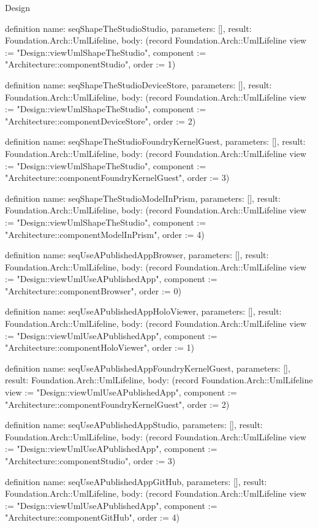 \begin{lexlean}{Design}
\begin{semanticmodule}
definition{
  name: seqShapeTheStudioStudio,
  parameters: [],
  result: Foundation.Arch::UmlLifeline,
  body: (record Foundation.Arch::UmlLifeline {view := "Design::viewUmlShapeTheStudio", component := "Architecture::componentStudio", order := 1})
}

definition{
  name: seqShapeTheStudioDeviceStore,
  parameters: [],
  result: Foundation.Arch::UmlLifeline,
  body: (record Foundation.Arch::UmlLifeline {view := "Design::viewUmlShapeTheStudio", component := "Architecture::componentDeviceStore", order := 2})
}

definition{
  name: seqShapeTheStudioFoundryKernelGuest,
  parameters: [],
  result: Foundation.Arch::UmlLifeline,
  body: (record Foundation.Arch::UmlLifeline {view := "Design::viewUmlShapeTheStudio", component := "Architecture::componentFoundryKernelGuest", order := 3})
}

definition{
  name: seqShapeTheStudioModelInPrism,
  parameters: [],
  result: Foundation.Arch::UmlLifeline,
  body: (record Foundation.Arch::UmlLifeline {view := "Design::viewUmlShapeTheStudio", component := "Architecture::componentModelInPrism", order := 4})
}

definition{
  name: seqUseAPublishedAppBrowser,
  parameters: [],
  result: Foundation.Arch::UmlLifeline,
  body: (record Foundation.Arch::UmlLifeline {view := "Design::viewUmlUseAPublishedApp", component := "Architecture::componentBrowser", order := 0})
}

definition{
  name: seqUseAPublishedAppHoloViewer,
  parameters: [],
  result: Foundation.Arch::UmlLifeline,
  body: (record Foundation.Arch::UmlLifeline {view := "Design::viewUmlUseAPublishedApp", component := "Architecture::componentHoloViewer", order := 1})
}

definition{
  name: seqUseAPublishedAppFoundryKernelGuest,
  parameters: [],
  result: Foundation.Arch::UmlLifeline,
  body: (record Foundation.Arch::UmlLifeline {view := "Design::viewUmlUseAPublishedApp", component := "Architecture::componentFoundryKernelGuest", order := 2})
}

definition{
  name: seqUseAPublishedAppStudio,
  parameters: [],
  result: Foundation.Arch::UmlLifeline,
  body: (record Foundation.Arch::UmlLifeline {view := "Design::viewUmlUseAPublishedApp", component := "Architecture::componentStudio", order := 3})
}

definition{
  name: seqUseAPublishedAppGitHub,
  parameters: [],
  result: Foundation.Arch::UmlLifeline,
  body: (record Foundation.Arch::UmlLifeline {view := "Design::viewUmlUseAPublishedApp", component := "Architecture::componentGitHub", order := 4})
}


\end{semanticmodule}
\end{lexlean}
